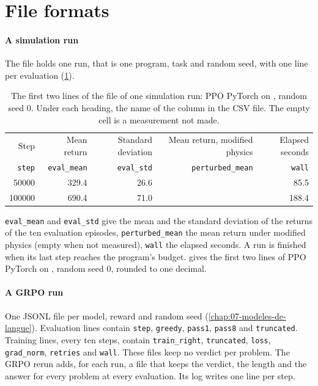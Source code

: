 \section{File formats}
\label{sec:formats}

\paragraph{A simulation run} The file  holds one
run, that is one program, task and random seed, with one line per evaluation (\cref{tab:format-essai}).
\begin{table}[htbp]
\centering
\small
\caption{The first two lines of the file of one simulation run: PPO PyTorch on , random seed 0. Under each heading, the name of the column in the CSV file. The empty cell is a measurement not made.}
\label{tab:format-essai}
\begin{tabular}{@{}rrrrr@{}}
\toprule
Step & Mean return & Standard deviation & Mean return, modified physics & Elapsed seconds \\
{\footnotesize\texttt{step}} & {\footnotesize\texttt{eval\_mean}} & {\footnotesize\texttt{eval\_std}} & {\footnotesize\texttt{perturbed\_mean}} & {\footnotesize\texttt{wall}} \\
\midrule
\num{50000} & \num{329.4} & \num{26.6} & & \num{85.5} \\
\num{100000} & \num{690.4} & \num{71.0} & & \num{188.4} \\
\bottomrule
\end{tabular}
\end{table}
\texttt{eval\_mean} and \texttt{eval\_std} give the mean and the standard deviation of the returns of
the ten evaluation episodes, \texttt{perturbed\_mean} the mean return under modified physics (empty
when not measured), \texttt{wall} the elapsed seconds. A run is finished when its last step reaches
the program's budget.  gives the first two lines of PPO PyTorch on
, random seed 0, rounded to one decimal.

\paragraph{A GRPO run} One JSONL file per model, reward and random seed
(\cref{chap:07-modeles-de-langue}). Evaluation lines contain \texttt{step}, \texttt{greedy},
\texttt{pass1}, \texttt{pass8} and \texttt{truncated}. Training lines, every ten steps, contain
\texttt{train\_right}, \texttt{truncated}, \texttt{loss}, \texttt{grad\_norm}, \texttt{retries} and
\texttt{wall}. These files keep no verdict per problem. The GRPO rerun adds, for each run, a file
 that keeps the verdict, the length and the answer for every problem at
every evaluation. Its log writes one line per step.

